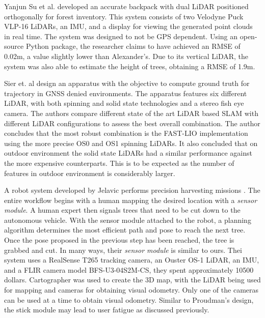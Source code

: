 Yanjun Su et al. \cite{su_development_2021} developed an accurate backpack with dual \acs*{LiDAR} positioned orthogonally for forest inventory. This system consists of two Velodyne Puck VLP-16 \acs*{LiDAR}s, an \acs*{IMU}, and a display for viewing the generated point clouds in real time. The system was designed to not be \acs*{GPS} dependent. Using an open-source Python package, the researcher claims to have achieved an \acs*{RMSE} of 0.02m, a value slightly lower than Alexander's. Due to its vertical \acs*{LiDAR}, the system was also able to estimate the height of trees, obtaining a \acs*{RMSE} of 1.9m.

Sier et. al \cite{sier_benchmark_2022} design an apparatus with the objective to compute ground truth for trajectory in \acs*{GNSS} denied environments. The apparatus features six different \acs*{LiDAR}, with both spinning and solid state technologies and a stereo fish eye camera. The authors compare different state of the art \acs*{LiDAR} based \acs*{SLAM} with different \acs*{LiDAR} configurations to assess the best overall combination. The author concludes that the most robust combination is the FAST-LIO \cite{xu_fast-lio_2021} implementation using the more precise OS0 and OS1 spinning \acs*{LiDAR}s. It also concluded that on outdoor environment the solid state \acs*{LiDAR}s had a similar performance against the more expensive counterparts. This is to be expected as the number of features in outdoor environment is considerably larger.

A robot system developed by Jelavic performs precision harvesting missions \cite{jelavic_towards_2021}. The entire workflow begins with a human mapping the desired location with a \textit{sensor module}. A human expert then signals trees that need to be cut down to the autonomous vehicle. With the sensor module attached to the robot, a planning algorithm determines the most efficient path and pose to reach the next tree. Once the pose proposed in the previous step has been reached, the tree is grabbed and cut. In many ways, their \textit{sensor module} is similar to ours. Thei system uses a RealSense T265 tracking camera, an Ouster OS-1 \acs*{LiDAR}, an \acs*{IMU}, and a FLIR camera model BFS-U3-04S2M-CS, they spent approximately 10500 dollars. Cartographer was used to create the 3D map, with the \acs{LiDAR} being used for mapping and cameras for obtaining visual odometry. Only one of the cameras can be used at a time to obtain visual odometry. Similar to Proudman's design, the stick module may lead to user fatigue as discussed previously.

